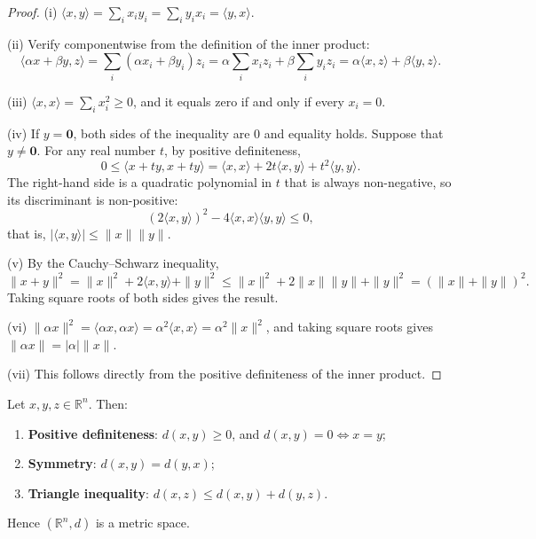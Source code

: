 \begin{proof}
(i) $\langle x, y \rangle = \sum_i x_i y_i = \sum_i y_i x_i = \langle y, x \rangle$.

(ii) Verify componentwise from the definition of the inner product:
\[
\langle \alpha x + \beta y, z \rangle = \sum_i (\alpha x_i + \beta y_i) z_i = \alpha \sum_i x_i z_i + \beta \sum_i y_i z_i = \alpha \langle x, z \rangle + \beta \langle y, z \rangle.
\]

(iii) $\langle x, x \rangle = \sum_i x_i^2 \ge 0$, and it equals zero if and only if every $x_i = 0$.

(iv) If $y = \mathbf{0}$, both sides of the inequality are $0$ and equality holds. Suppose that $y \neq \mathbf{0}$. For any real number $t$, by positive definiteness,
\[
0 \le \langle x + t y, x + t y \rangle = \langle x, x \rangle + 2t \langle x, y \rangle + t^2 \langle y, y \rangle.
\]
The right-hand side is a quadratic polynomial in $t$ that is always non-negative, so its discriminant is non-positive:
\[
(2 \langle x, y \rangle)^2 - 4 \langle x, x \rangle \langle y, y \rangle \le 0,
\]
that is, $|\langle x, y \rangle| \le \|x\| \|y\|$.

(v) By the Cauchy--Schwarz inequality,
\[
\|x + y\|^2 = \|x\|^2 + 2\langle x, y \rangle + \|y\|^2 \le \|x\|^2 + 2\|x\| \|y\| + \|y\|^2 = (\|x\| + \|y\|)^2.
\]
Taking square roots of both sides gives the result.

(vi) $\|\alpha x\|^2 = \langle \alpha x, \alpha x \rangle = \alpha^2 \langle x, x \rangle = \alpha^2 \|x\|^2$, and taking square roots gives $\|\alpha x\| = |\alpha| \|x\|$.

(vii) This follows directly from the positive definiteness of the inner product.
\end{proof}

\begin{corollary}\label{cor:metric_axioms}
Let $x, y, z \in \mathbb{R}^n$. Then:
\begin{enumerate}[label=(\roman*)]
    \item \textbf{Positive definiteness}: $d(x, y) \ge 0$, and $d(x, y) = 0 \iff x = y$;
    \item \textbf{Symmetry}: $d(x, y) = d(y, x)$;
    \item \textbf{Triangle inequality}: $d(x, z) \le d(x, y) + d(y, z)$.
\end{enumerate}
Hence $(\mathbb{R}^n, d)$ is a metric space.
\end{corollary}

